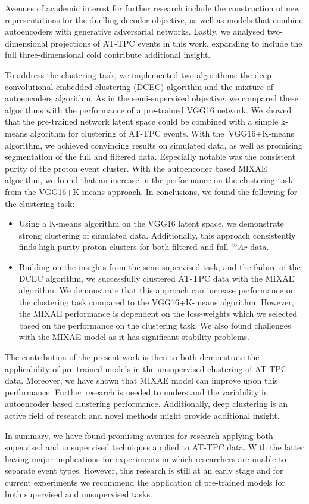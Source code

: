 Avenues of academic interest for further research include the construction of new representations for the duelling decoder objective, as well as models that combine autoencoders with generative adversarial networks.  Lastly, we analysed two-dimensional projections of AT-TPC events in this work, expanding to include the full three-dimensional cold contribute additional insight.

To address the clustering task, we implemented two algorithms: the deep convolutional embedded clustering (DCEC) algorithm and the mixture of autoencoders algorithm. As in the semi-supervised objective, we compared these algorithms with the performance of a pre-trained VGG16 network. We showed that the pre-trained network latent space could be combined with a simple k-means algorithm for clustering of AT-TPC events. With the VGG16+K-means algorithm, we achieved convincing results on simulated data, as well as promising segmentation of the full and filtered data. Especially notable was the consistent purity of the proton event cluster. With the autoencoder based MIXAE  algorithm, we found that an increase in the performance on the clustering task from the VGG16+K-means approach.  In conclusions, we found the following for the clustering task:

\begin{itemize}
\item Using a K-means algorithm on the VGG16 latent space, we demonstrate strong clustering of simulated data. Additionally, this approach consistently finds high purity proton clusters for both filtered and full ${}^{46}Ar$ data.
\item Building on the insights from the semi-supervised task, and the failure of the DCEC algorithm,  we successfully clustered AT-TPC data with the MIXAE algorithm. We demonstrate that this approach can increase performance on the clustering task compared to the VGG16+K-means algorithm.  However, the MIXAE performance is dependent on the loss-weights which we selected based on the performance on the clustering task. We also found challenges with the MIXAE model as it has significant stability problems. 
\end{itemize}

The contribution of the present work is then to both demonstrate the applicability of pre-trained models in the unsupervised clustering of AT-TPC data. Moreover, we have shown that MIXAE model can improve upon this performance. Further research is needed to understand the variability in autoencoder based clustering performance. Additionally, deep clustering is an active field of research and novel methods might provide additional insight. 

In summary, we have found promising avenues for research applying both supervised and unsupervised techniques applied to AT-TPC data. With the latter having major implications for experiments in which researchers are unable to separate event types. However, this research is still at an early stage and for current experiments we recommend the application of pre-trained models for both supervised and unsupervised tasks.